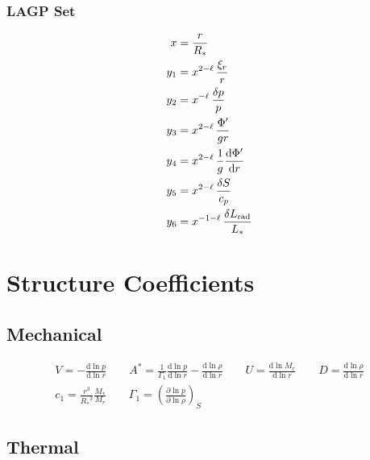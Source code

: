 \documentclass[fleqn]{article}
\newcommand{\diff}{\ensuremath{\mathrm{d}}}
\newcommand{\As}{\ensuremath{A^{\ast}}}
\newcommand{\Rstar}{\ensuremath{R_{\ast}}}
\newcommand{\Mstar}{\ensuremath{M_{\ast}}}
\newcommand{\Lrad}{\ensuremath{L_{\rm rad}}}
\newcommand{\Lstar}{\ensuremath{L_{\ast}}}
\begin{document}
{\subsubsection*{LAGP Set}

\begin{align*}
x     &= \frac{r}{\Rstar} \\
y_{1} &= x^{2-\ell}\, \frac{\xi_{r}}{r} \\
y_{2} &= x^{ -\ell}\, \frac{\delta p}{p} \\
y_{3} &= x^{2-\ell}\, \frac{\Phi'}{gr} \\
y_{4} &= x^{2-\ell}\, \frac{1}{g} \frac{\diff \Phi'}{\diff r} \\
y_{5} &= x^{2-\ell}\, \frac{\delta S}{c_{p}}\\
y_{6} &= x^{-1-\ell}\, \frac{\delta \Lrad}{\Lstar}
\end{align*}


\newpage

\section*{Structure Coefficients}

\subsection*{Mechanical}

\begin{gather*}
V = -\frac{\diff \ln p}{\diff \ln r} \qquad
\As = \frac{1}{\Gamma_{1}} \frac{\diff \ln p}{\diff \ln r} - \frac{\diff \ln \rho}{\diff \ln r} \qquad
U = \frac{\diff \ln M_{r}}{\diff \ln r} \qquad
D = \frac{\diff \ln \rho}{\diff \ln r} \\
c_1 = \frac{r^{3}}{\Rstar^{3}} \frac{\Mstar}{M_{r}} \qquad
\Gamma_{1} = \left( \frac{\partial \ln p}{\partial \ln \rho} \right)_{S}
\end{gather*}

\subsection*{Thermal}

}
\end{document}
